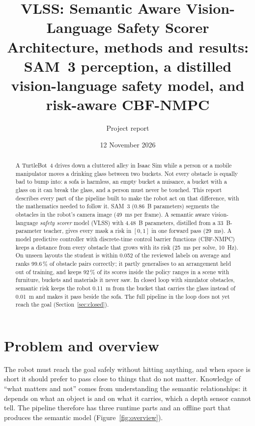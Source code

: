 \documentclass[10pt,a4paper]{article}
\title{VLSS: Semantic Aware Vision-Language Safety Scorer\\[3pt]\large Architecture, methods and results:\\
SAM~3 perception, a distilled vision-language safety model, and risk-aware CBF-NMPC}
\author{Project report}
\date{12 November 2026}
\begin{document}
\maketitle

\begin{abstract}
A TurtleBot~4 drives down a cluttered alley in Isaac Sim while a person or a mobile manipulator moves a drinking glass between
two buckets. Not every obstacle is equally bad to bump into: a sofa is harmless, an empty bucket a nuisance, a bucket with a
glass on it can break the glass, and a person must never be touched. This report describes every part of the pipeline built to
make the robot act on that difference, with the mathematics needed to follow it. SAM~3 (0.86~B parameters) segments the
obstacles in the robot's camera image (49~ms per frame). A semantic aware vision-language \emph{safety scorer} model (VLSS) with 4.48~B parameters,
distilled from a 33~B-parameter teacher, gives every mask a risk in $[0,1]$ in one forward pass (29~ms). A model predictive
controller with discrete-time control barrier functions (CBF-NMPC) keeps a distance from every obstacle that grows with its
risk (25~ms per solve, 10~Hz). On unseen layouts the student is within 0.052 of the reviewed labels on average and ranks 99.6\,\%
of obstacle pairs correctly; it partly generalises to an arrangement held out of training, and keeps 92\,\% of its scores inside
the policy ranges in a scene with furniture, buckets and materials it never saw. In closed loop with simulator obstacles,
semantic risk keeps the robot 0.11~m from the bucket that carries the glass instead of 0.01~m and makes it pass beside the sofa.
The full pipeline in the loop does not yet reach the goal (Section~\ref{sec:closed}).
\end{abstract}

\tableofcontents
\newpage

\section{Problem and overview}

The robot must reach the goal safely without hitting anything, and when space is short it should prefer to pass close to
things that do not matter. Knowledge of ``what matters and not'' comes from understanding the semantic relationships: it depends on what an object is and on what it carries, which a depth
sensor cannot tell. The pipeline therefore has three runtime parts and an offline part that produces the semantic model
(Figure~\ref{fig:overview}).
\end{document}
